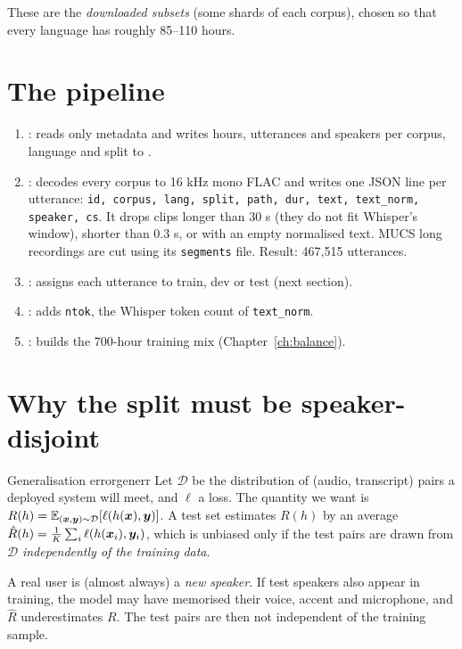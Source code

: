 These are the \emph{downloaded subsets} (some shards of each corpus), chosen so that every language has roughly 85--110 hours.

\section{The pipeline}

\begin{enumerate}
\item {}: reads only metadata and writes hours, utterances and speakers per corpus, language and split to
.
\item {}: decodes every corpus to 16 kHz mono FLAC and writes one JSON line per utterance:
\texttt{id, corpus, lang, split, path, dur, text, text\_norm, speaker, cs}. It drops clips longer than 30 s (they do not fit
Whisper's window), shorter than 0.3 s, or with an empty normalised text. MUCS long recordings are cut using its \texttt{segments}
file. Result: 467{,}515 utterances.
\item {}: assigns each utterance to train, dev or test (next section).
\item {}: adds \texttt{ntok}, the Whisper token count of \texttt{text\_norm}.
\item {}: builds the 700-hour training mix (Chapter~\ref{ch:balance}).
\end{enumerate}

\section{Why the split must be speaker-disjoint}

\begin{definition}{Generalisation error}{generr}
Let $\mathcal D$ be the distribution of (audio, transcript) pairs a deployed system will meet, and $\ell$ a loss. The quantity we
want is $R(h)=\mathbb{E}_{(\bm{x},\bm{y})\sim\mathcal D}[\ell(h(\bm{x}),\bm{y})]$. A test set estimates $R(h)$ by an average
$\hat R(h)=\frac1K\sum_{i}\ell(h(\bm{x}_i),\bm{y}_i)$, which is unbiased only if the test pairs are drawn from $\mathcal D$
\emph{independently of the training data}.
\end{definition}

A real user is (almost always) a \emph{new speaker}. If test speakers also appear in training, the model may have memorised their
voice, accent and microphone, and $\hat R$ underestimates $R$. The test pairs are then not independent of the training sample.


